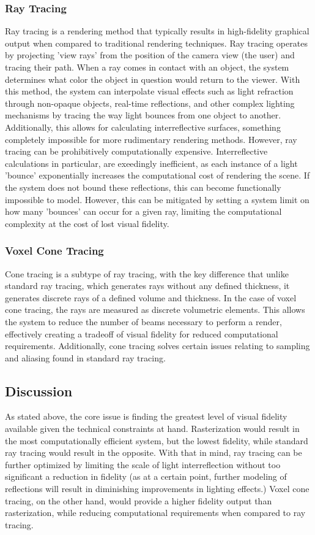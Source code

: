 \documentclass[onecolumn, draftclsnofoot,10pt, compsoc]{IEEEtran}
\begin{document}
\subsubsection{Ray Tracing}
Ray tracing is a rendering method that typically results in high-fidelity graphical output when compared to traditional rendering techniques. Ray tracing operates by projecting 'view rays' from the position of the camera view (the user) and tracing their path. When a ray comes in contact with an object, the system determines what color the object in question would return to the viewer. With this method, the system can interpolate visual effects such as light refraction through non-opaque objects, real-time reflections, and other complex lighting mechanisms by tracing the way light bounces from one object to another. Additionally, this allows for calculating interreflective surfaces, something completely impossible for more rudimentary rendering methods. However, ray tracing can be prohibitively computationally expensive. Interreflective calculations in particular, are exeedingly inefficient, as each instance of a light 'bounce' exponentially increases the computational cost of rendering the scene. If the system does not bound these reflections, this can become functionally impossible to model. However, this can be mitigated by setting a system limit on how many 'bounces' can occur for a given ray, limiting the computational complexity at the cost of lost visual fidelity. 

\subsubsection{Voxel Cone Tracing}
Cone tracing is a subtype of ray tracing, with the key difference that unlike standard ray tracing, which generates rays without any defined thickness, it generates discrete rays of a defined volume and thickness. In the case of voxel cone tracing, the rays are measured as discrete volumetric elements. This allows the system to reduce the number of beams necessary to perform a render, effectively creating a tradeoff of visual fidelity for reduced computational requirements. Additionally, cone tracing solves certain issues relating to sampling and aliasing found in standard ray tracing.

\subsection{Discussion}
As stated above, the core issue is finding the greatest level of visual fidelity available given the technical constraints at hand. Rasterization would result in the most computationally efficient system, but the lowest fidelity, while standard ray tracing would result in the opposite. With that in mind, ray tracing can be further optimized by limiting the scale of light interreflection without too significant a reduction in fidelity (as at a certain point, further modeling of reflections will result in diminishing improvements in lighting effects.) Voxel cone tracing, on the other hand, would provide a higher fidelity output than rasterization, while reducing computational requirements when compared to ray tracing.
\end{document}
